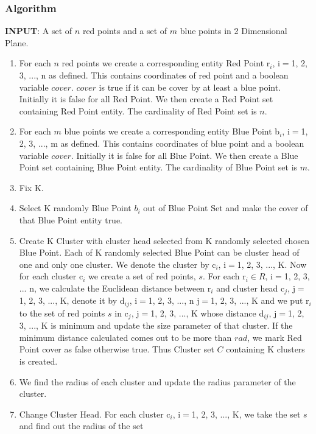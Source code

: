 \documentclass[12pt,a4wide]{report}
\theoremstyle{plain}
\theoremstyle{definition}
\theoremstyle{remark}
\begin{document}
 \subsubsection{Algorithm}
 \textbf{INPUT}: A set of $n$ red points and a set of $m$ blue points in 2 Dimensional Plane.\\
\begin{enumerate}
 \item For each $n$ red points we create a corresponding entity Red Point r$_{i}$, i$=$1, 2, 3, ..., n as defined. This contains 
 coordinates of red point and a boolean variable $cover$. $cover$ is true if it can be cover by at least a blue point. Initially 
 it is false for all Red Point. We then create a Red Point set containing Red Point entity. The cardinality of Red Point set is $n$.
 \item For each $m$ blue points we create a corresponding entity Blue Point b$_{i}$, i$=$1, 2, 3, ..., m as defined. This contains 
 coordinates of blue point and a boolean variable $cover$. Initially it is false for all Blue Point. We then create 
 a Blue Point set containing Blue Point entity. The cardinality of Blue Point set is $m$.
 \item Fix K.
 \item Select K randomly Blue Point $b_{i}$ out of Blue Point Set and make the cover of that Blue Point entity true.
 \item Create K Cluster with cluster head selected from K randomly selected chosen Blue Point. Each of K randomly 
 selected Blue Point can be cluster head of one and only one cluster. We denote the cluster by c$_{i}$, i$=$1, 2, 3, ..., K. 
 Now for each cluster c$_{i}$ we create a set of red points, $s$. For each r$_{i} \in R$, i$=$1, 2, 3, ... n, we calculate the Euclidean 
  distance between r$_{i}$ and cluster head c$_{j}$, j$=$1, 2, 3, ..., K, denote it by d$_{ij}$, i$=$1, 2, 3, ..., n  j$=$1, 2, 3, ..., K 
  and we put r$_{i}$ to the set of red points $s$ in c$_{j}$, j$=$1, 2, 3, ..., K whose distance d$_{ij}$, j$=$1, 2, 3, ..., K is 
  minimum and update the size parameter of that cluster. If the minimum distance calculated comes out to be more than $rad$, 
  we mark Red Point cover as false otherwise true. Thus Cluster set $C$ containing K clusters is created.
\item We find the radius of each cluster and update the radius parameter of the cluster.
\item Change Cluster Head. For each cluster c$_{i}$, i$=$1, 2, 3, ..., K, we take the set $s$ and find out the radius of the set 

\end{enumerate}
\end{document}
